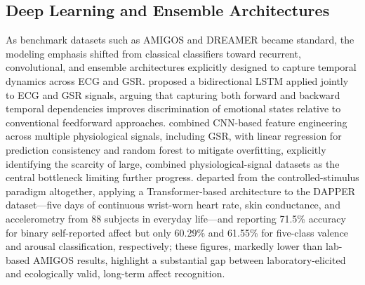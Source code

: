 \subsection{Deep Learning and Ensemble Architectures}
As benchmark datasets such as AMIGOS and DREAMER became standard, the modeling emphasis shifted from classical classifiers toward recurrent, convolutional, and ensemble architectures explicitly designed to capture temporal dynamics across ECG and GSR. \cite{sumanth2025bilstm} proposed a bidirectional LSTM applied jointly to ECG and GSR signals, arguing that capturing both forward and backward temporal dependencies improves discrimination of emotional states relative to conventional feedforward approaches. \cite{naveen2025emotion} combined CNN-based feature engineering across multiple physiological signals, including GSR, with linear regression for prediction consistency and random forest to mitigate overfitting, explicitly identifying the scarcity of large, combined physiological-signal datasets as the central bottleneck limiting further progress. \cite{li2025transformer} departed from the controlled-stimulus paradigm altogether, applying a Transformer-based architecture to the DAPPER dataset---five days of continuous wrist-worn heart rate, skin conductance, and accelerometry from 88 subjects in everyday life---and reporting 71.5\% accuracy for binary self-reported affect but only 60.29\% and 61.55\% for five-class valence and arousal classification, respectively; these figures, markedly lower than lab-based AMIGOS results, highlight a substantial gap between laboratory-elicited and ecologically valid, long-term affect recognition.

